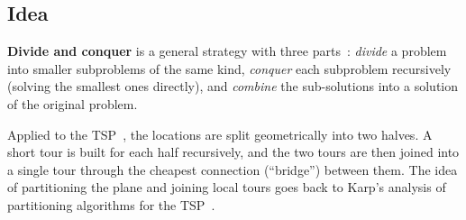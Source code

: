 \subsection{Idea}
\textbf{Divide and conquer} is a general strategy with three
parts~\cite{cormen2009introduction}: \emph{divide} a problem into smaller subproblems of the same kind,
\emph{conquer} each subproblem recursively (solving the smallest ones directly), and \emph{combine} the
sub-solutions into a solution of the original problem.

Applied to the TSP~\cite{lunagarcia2024performance}, the locations are split
geometrically into two halves. A short tour is built for each half recursively, and the two tours are
then joined into a single tour through the cheapest connection (``bridge'') between them. The idea of
partitioning the plane and joining local tours goes back to Karp's analysis of partitioning algorithms
for the TSP~\cite{karp1977probabilistic}.
